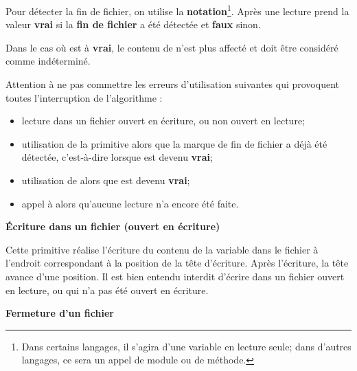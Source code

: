 Pour détecter la fin de fichier, on utilise la
\textbf{notation}\footnote{Dans certains langages, il
s'agira d'une variable en lecture
seule; dans d'autres langages, ce sera un appel de
module ou de méthode.}.
Après une lecture  prend la valeur
\textbf{vrai} si la \textbf{fin de fichier} a été détectée et
\textbf{faux} sinon.

Dans le cas où  est à
\textbf{vrai}, le contenu de 
 n’est plus affecté et doit être
considéré comme indéterminé.

Attention à ne pas commettre les erreurs d’utilisation suivantes qui
provoquent toutes l’interruption de l’algorithme :

\liststyleListv
\begin{itemize}
	\item 
		lecture dans un fichier ouvert en écriture, ou non ouvert en lecture;
	\item 
		utilisation de la primitive  alors que la marque de
		fin de fichier a déjà été détectée, c’est-à-dire lorsque
		 est devenu \textbf{vrai};
	\item 
		utilisation de  alors que
		 est devenu \textbf{vrai};
	\item 
		appel à  alors
		qu'aucune lecture n'a encore été faite.
\end{itemize}

{\sffamily\bfseries
Écriture dans un fichier (ouvert en écriture) }


Cette primitive réalise l’écriture du contenu de la variable
 dans le fichier
 à l’endroit correspondant à la position
de la tête d’écriture. Après l’écriture, la tête avance d’une position.
Il est bien entendu interdit d’écrire dans un fichier ouvert en
lecture, ou qui n’a pas été ouvert en écriture. 

{\sffamily\bfseries\upshape
Fermeture d’un fichier }


